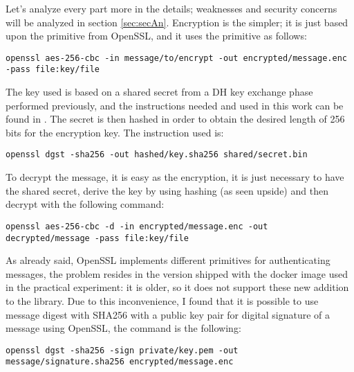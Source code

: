 \documentclass{article}
\begin{document}
Let's analyze every part more in the details; weaknesses and security concerns will be analyzed in section \ref{sec:secAn}.\newline
Encryption is the simpler; it is just based upon the primitive from OpenSSL, and it uses the primitive as follows: 

\begin{lstlisting}[breaklines]
openssl aes-256-cbc -in message/to/encrypt -out encrypted/message.enc -pass file:key/file
\end{lstlisting}

The key used is based on a shared secret from a DH key exchange phase performed previously, and the instructions needed and used in this work can be found in \cite{DHKE}. The secret is then hashed in order to obtain the desired length of 256 bits for the encryption key. The instruction used is:

\begin{lstlisting}[breaklines]
openssl dgst -sha256 -out hashed/key.sha256 shared/secret.bin
\end{lstlisting}

To decrypt the message, it is easy as the encryption, it is just necessary to have the shared secret, derive the key by using hashing (as seen upside) and then decrypt with the following command:

\begin{lstlisting}[breaklines]
openssl aes-256-cbc -d -in encrypted/message.enc -out decrypted/message -pass file:key/file
\end{lstlisting}
\label{ins:AES}

As already said, OpenSSL implements different primitives for authenticating messages, the problem resides in the version shipped with the docker image used in the practical experiment: it is older, so it does not support these new addition to the library. Due to this inconvenience, I found \cite{signatures} that it is possible to use message digest with SHA256 with a public key pair for digital signature of a message using OpenSSL, the command is the following:

\begin{lstlisting}[breaklines]
openssl dgst -sha256 -sign private/key.pem -out message/signature.sha256 encrypted/message.enc
\end{lstlisting}
\end{document}
